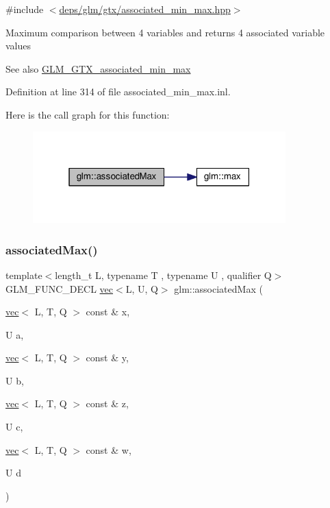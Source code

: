 {\ttfamily \#include $<$\hyperlink{associated__min__max_8hpp}{deps/glm/gtx/associated\+\_\+min\+\_\+max.\+hpp}$>$}

Maximum comparison between 4 variables and returns 4 associated variable values \begin{DoxySeeAlso}{See also}
\hyperlink{group__gtx__associated__min__max}{G\+L\+M\+\_\+\+G\+T\+X\+\_\+associated\+\_\+min\+\_\+max} 
\end{DoxySeeAlso}


Definition at line 314 of file associated\+\_\+min\+\_\+max.\+inl.

Here is the call graph for this function\+:
\nopagebreak
\begin{figure}[H]
\begin{center}
\leavevmode
\includegraphics[width=277pt]{d6/d10/group__gtx__associated__min__max_ga11477c2c4b5b0bfd1b72b29df3725a9d_cgraph}
\end{center}
\end{figure}
\mbox{\label{group__gtx__associated__min__max_gab9c3dd74cac899d2c625b5767ea3b3fb}} 
\subsubsection{\texorpdfstring{associated\+Max()}{associatedMax()}\hspace{0.1cm}{\footnotesize\ttfamily [12/12]}}
{\footnotesize\ttfamily template$<$length\+\_\+t L, typename T , typename U , qualifier Q$>$ \\
G\+L\+M\+\_\+\+F\+U\+N\+C\+\_\+\+D\+E\+CL \hyperlink{structglm_1_1vec}{vec}$<$L, U, Q$>$ glm\+::associated\+Max (\begin{DoxyParamCaption}\item[{\hyperlink{structglm_1_1vec}{vec}$<$ L, T, Q $>$ const \&}]{x,  }\item[{U}]{a,  }\item[{\hyperlink{structglm_1_1vec}{vec}$<$ L, T, Q $>$ const \&}]{y,  }\item[{U}]{b,  }\item[{\hyperlink{structglm_1_1vec}{vec}$<$ L, T, Q $>$ const \&}]{z,  }\item[{U}]{c,  }\item[{\hyperlink{structglm_1_1vec}{vec}$<$ L, T, Q $>$ const \&}]{w,  }\item[{U}]{d }\end{DoxyParamCaption})}



